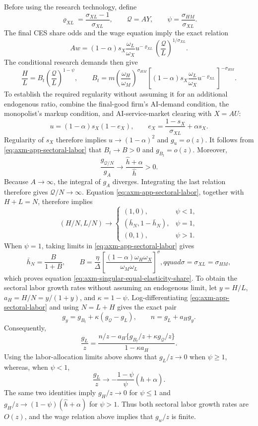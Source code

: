 Before using the research technology, define
\[
 \varrho_{XL}=\frac{\sigma_{XL}-1}{\sigma_{XL}},\qquad
 \mathcal Q=AY,\qquad
 \psi=\frac{\sigma_{HM}}{\sigma_{XL}}.
\]
The final CES share odds and the wage equation imply the exact relation
\[
 Aw=(1-\alpha)s_X\frac{\omega_L}{\omega_X}
 u^{-\varrho_{XL}}
 \left(\frac{\mathcal Q}{L}\right)^{1/\sigma_{XL}}.
\]
The conditional research demands then give
\begin{equation}
 \frac{H}{L}=B_t
 \left(\frac{\mathcal Q}{L}\right)^{1-\psi},
 \qquad
 B_t=m\left(\frac{\omega_H}{\omega_M}\right)^{\sigma_{HM}}
 \left[(1-\alpha)s_X\frac{\omega_L}{\omega_X}
 u^{-\varrho_{XL}}\right]^{-\sigma_{HM}}.
 \label{eq:axm-app-sectoral-labor}
\end{equation}
To establish the required regularity without assuming it for an additional
endogenous ratio, combine the final-good firm's AI-demand condition, the
monopolist's markup condition, and AI-service-market clearing with \(X=AU\):
\[
 u=(1-\alpha)s_X(1-e_X),\qquad
 e_X=\frac{1-s_X}{\sigma_{XL}}+\alpha s_X.
\]
Regularity of \(s_X\) therefore implies
\(u\to(1-\alpha)^2\) and \(g_u=o(z)\). It follows from
\eqref{eq:axm-app-sectoral-labor} that \(B_t\to B>0\) and
\(g_{B_t}=o(z)\). Moreover,
\[
 \frac{g_{\mathcal Q/N}}{g_A}
 \to\frac{\widehat h+\alpha}{\widehat h}>0.
\]
Because \(A\to\infty\), the integral of \(g_A\) diverges. Integrating the last
relation therefore gives \(\mathcal Q/N\to\infty\).
Equation \eqref{eq:axm-app-sectoral-labor}, together with \(H+L=N\), therefore
implies
\[
 (H/N,L/N)\to
 \begin{cases}
  (1,0),&\psi<1,\\
  (\bar h_N,1-\bar h_N),&\psi=1,\\
  (0,1),&\psi>1.
 \end{cases}
\]
When \(\psi=1\), taking limits in
\eqref{eq:axm-app-sectoral-labor} gives
\[
 \bar h_N=\frac{B}{1+B},\qquad
 B=\frac{\eta}{\Delta}
 \left[
  \frac{(1-\alpha)\omega_H\omega_X}{\omega_M\omega_L}
 \right]^{\sigma},qquad
 \sigma=\sigma_{XL}=\sigma_{HM},
\]
which proves equation
\eqref{eq:axm-singular-equal-elasticity-share}.
To obtain the sectoral labor growth rates without assuming an endogenous limit,
let \(y=H/L\), \(a_H=H/N=y/(1+y)\), and
\(\kappa=1-\psi\). Log-differentiating
\eqref{eq:axm-app-sectoral-labor} and using \(N=L+H\) gives the exact pair
\[
 g_y=g_{B_t}+\kappa(g_{\mathcal Q}-g_L),\qquad
 n=g_L+a_Hg_y.
\]
Consequently,
\[
 \frac{g_L}{z}
 =
 \frac{n/z-a_H\{g_{B_t}/z+\kappa g_{\mathcal Q}/z\}}
 {1-\kappa a_H}.
\]
Using the labor-allocation limits above shows that \(g_L/z\to0\) when
\(\psi\geq1\), whereas, when \(\psi<1\),
\begin{equation}
 \frac{g_L}{z}\to
 -\frac{1-\psi}{\psi}(\widehat h+\alpha).
 \label{eq:axm-app-production-labor-growth}
\end{equation}
The same two identities imply \(g_H/z\to0\) for \(\psi\leq1\) and
\(g_H/z\to(1-\psi)(\widehat h+\alpha)\) for \(\psi>1\).
Thus both sectoral labor growth rates are \(O(z)\), and the wage relation above
implies that \(g_w/z\) is finite.

